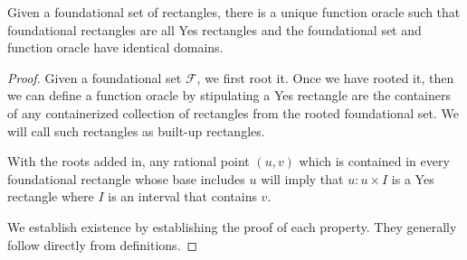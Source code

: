 \documentclass[12pt]{article}
\begin{document}
\begin{proposition}\label{pr:foundation}
    Given a foundational set of rectangles, there is a unique function oracle such that foundational rectangles are all Yes rectangles and the foundational set and function oracle have identical domains. 
\end{proposition}



\begin{proof}
Given a foundational set $\mathcal{F}$, we first root it. Once we have rooted it, then we can define a function oracle by stipulating a Yes rectangle are the containers of any containerized collection of rectangles from the rooted foundational set. We will call such rectangles as built-up rectangles. 

With the roots added in, any rational point $(u,v)$ which is contained in every foundational rectangle whose base includes $u$ will imply that $u:u \times I$ is a Yes rectangle where $I$ is an interval that contains $v$. 
    
    We establish existence by establishing the proof of each property. They generally follow directly from definitions. 


\end{proof}
\end{document}
